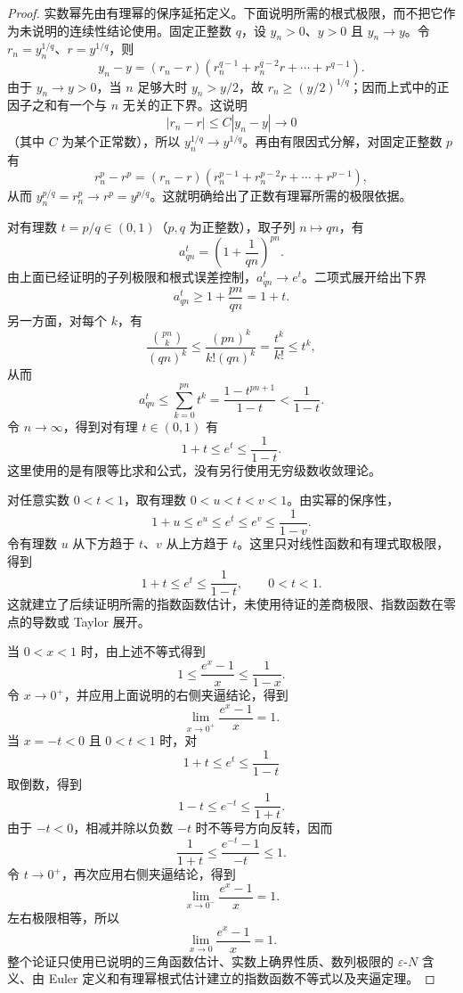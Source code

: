 \documentclass[UTF8,fontset=fandol,11pt]{ctexart}
\begin{document}
\begin{proof}
实数幂先由有理幂的保序延拓定义。下面说明所需的根式极限，而不把它作为未说明的连续性结论使用。固定正整数 $q$，设 $y_n>0$、$y>0$ 且 $y_n\to y$。令 $r_n=y_n^{1/q}$、$r=y^{1/q}$，则
\[
y_n-y=(r_n-r)(r_n^{q-1}+r_n^{q-2}r+\cdots+r^{q-1}).
\]
由于 $y_n\to y>0$，当 $n$ 足够大时 $y_n>y/2$，故 $r_n\geq(y/2)^{1/q}$；因而上式中的正因子之和有一个与 $n$ 无关的正下界。这说明
\[
|r_n-r|\leq C|y_n-y|\to0
\]
（其中 $C$ 为某个正常数），所以 $y_n^{1/q}\to y^{1/q}$。再由有限因式分解，对固定正整数 $p$ 有
\[
r_n^p-r^p=(r_n-r)(r_n^{p-1}+r_n^{p-2}r+\cdots+r^{p-1}),
\]
从而 $y_n^{p/q}=r_n^p\to r^p=y^{p/q}$。这就明确给出了正数有理幂所需的极限依据。

对有理数 $t=p/q\in(0,1)$（$p,q$ 为正整数），取子列 $n\mapsto qn$，有
\[
a_{qn}^t=\left(1+\frac1{qn}\right)^{pn}.
\]
由上面已经证明的子列极限和根式误差控制，$a_{qn}^t\to e^t$。二项式展开给出下界
\[
a_{qn}^t\geq1+\frac{pn}{qn}=1+t.
\]
另一方面，对每个 $k$，有
\[
\frac{\binom{pn}{k}}{(qn)^k}
\leq\frac{(pn)^k}{k!(qn)^k}
=\frac{t^k}{k!}\leq t^k,
\]
从而
\[
a_{qn}^t\leq\sum_{k=0}^{pn}t^k
=\frac{1-t^{pn+1}}{1-t}
<\frac1{1-t}.
\]
令 $n\to\infty$，得到对有理 $t\in(0,1)$ 有
\[
1+t\leq e^t\leq\frac1{1-t}.
\]
这里使用的是有限等比求和公式，没有另行使用无穷级数收敛理论。

对任意实数 $0<t<1$，取有理数 $0<u<t<v<1$。由实幂的保序性，
\[
1+u\leq e^u\leq e^t\leq e^v\leq\frac1{1-v}.
\]
令有理数 $u$ 从下方趋于 $t$、$v$ 从上方趋于 $t$。这里只对线性函数和有理式取极限，得到
\[
1+t\leq e^t\leq\frac1{1-t},\qquad 0<t<1.
\]
这就建立了后续证明所需的指数函数估计，未使用待证的差商极限、指数函数在零点的导数或 Taylor 展开。

当 $0<x<1$ 时，由上述不等式得到
\[
1\leq\frac{e^x-1}{x}\leq\frac{1}{1-x}.
\]
令 $x\to0^+$，并应用上面说明的右侧夹逼结论，得到
\[
\lim_{x\to0^+}\frac{e^x-1}{x}=1.
\]
当 $x=-t<0$ 且 $0<t<1$ 时，对
\[
1+t\leq e^t\leq\frac1{1-t}
\]
取倒数，得到
\[
1-t\leq e^{-t}\leq\frac1{1+t}.
\]
由于 $-t<0$，相减并除以负数 $-t$ 时不等号方向反转，因而
\[
\frac1{1+t}\leq\frac{e^{-t}-1}{-t}\leq1.
\]
令 $t\to0^+$，再次应用右侧夹逼结论，得到
\[
\lim_{x\to0^-}\frac{e^x-1}{x}=1.
\]
左右极限相等，所以
\[
\lim_{x\to0}\frac{e^x-1}{x}=1.
\]
整个论证只使用已说明的三角函数估计、实数上确界性质、数列极限的 $\varepsilon$-$N$ 含义、由 Euler 定义和有理幂根式估计建立的指数函数不等式以及夹逼定理。
\end{proof}
\end{document}
